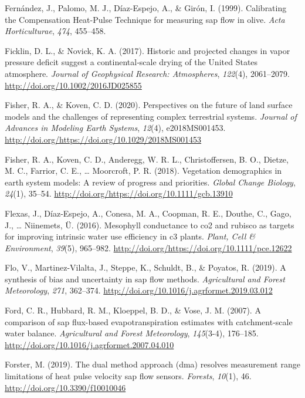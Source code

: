 \documentclass[11pt,twoside]{reedthesis}
\begin{document}
\hypertarget{ref-Fernandez1999}{}
Fernández, J., Palomo, M. J., Díaz-Espejo, A., \& Girón, I. (1999).
Calibrating the Compensation Heat-Pulse Technique for measuring sap flow
in olive. \emph{Acta Horticulturae}, \emph{474}, 455--458.

\hypertarget{ref-ficklin_historic_2017}{}
Ficklin, D. L., \& Novick, K. A. (2017). Historic and projected changes
in vapor pressure deficit suggest a continental‐scale drying of the
United States atmosphere. \emph{Journal of Geophysical Research:
Atmospheres}, \emph{122}(4), 2061--2079.
\url{http://doi.org/10.1002/2016JD025855}

\hypertarget{ref-Fisher2020}{}
Fisher, R. A., \& Koven, C. D. (2020). Perspectives on the future of
land surface models and the challenges of representing complex
terrestrial systems. \emph{Journal of Advances in Modeling Earth
Systems}, \emph{12}(4), e2018MS001453.
\url{http://doi.org/https://doi.org/10.1029/2018MS001453}

\hypertarget{ref-Fisher2018}{}
Fisher, R. A., Koven, C. D., Anderegg, W. R. L., Christoffersen, B. O.,
Dietze, M. C., Farrior, C. E., \ldots{} Moorcroft, P. R. (2018).
Vegetation demographics in earth system models: A review of progress and
priorities. \emph{Global Change Biology}, \emph{24}(1), 35--54.
\url{http://doi.org/https://doi.org/10.1111/gcb.13910}

\hypertarget{ref-Flexas2015}{}
Flexas, J., Díaz-Espejo, A., Conesa, M. A., Coopman, R. E., Douthe, C.,
Gago, J., \ldots{} Niinemets, Ü. (2016). Mesophyll conductance to co2
and rubisco as targets for improving intrinsic water use efficiency in
c3 plants. \emph{Plant, Cell \& Environment}, \emph{39}(5), 965--982.
\url{http://doi.org/https://doi.org/10.1111/pce.12622}

\hypertarget{ref-Flo2019}{}
Flo, V., Martinez-Vilalta, J., Steppe, K., Schuldt, B., \& Poyatos, R.
(2019). A synthesis of bias and uncertainty in sap flow methods.
\emph{Agricultural and Forest Meteorology}, \emph{271}, 362--374.
\url{http://doi.org/10.1016/j.agrformet.2019.03.012}

\hypertarget{ref-Ford2007}{}
Ford, C. R., Hubbard, R. M., Kloeppel, B. D., \& Vose, J. M. (2007). A
comparison of sap flux-based evapotranspiration estimates with
catchment-scale water balance. \emph{Agricultural and Forest
Meteorology}, \emph{145}(3-4), 176--185.
\url{http://doi.org/10.1016/j.agrformet.2007.04.010}

\hypertarget{ref-Forster_2019}{}
Forster, M. (2019). The dual method approach (dma) resolves measurement
range limitations of heat pulse velocity sap flow sensors.
\emph{Forests}, \emph{10}(1), 46. \url{http://doi.org/10.3390/f10010046}
\end{document}
